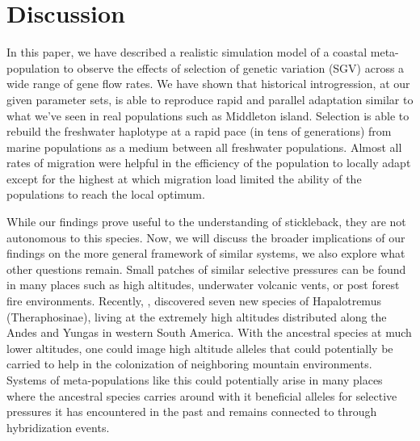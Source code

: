 \documentclass{article}
\begin{document}

\section*{Discussion}
 
In this paper, we have described a realistic simulation model of a coastal meta-population to observe the effects of selection of genetic variation (SGV) across a wide range of gene flow rates.
We have shown that historical introgression, at our given parameter sets, is able to reproduce rapid and parallel adaptation similar to what we've seen in real populations such as Middleton island. 
Selection is able to rebuild the freshwater haplotype at a rapid pace (in tens of generations) from marine populations as a medium between all freshwater populations. 
Almost all rates of migration were helpful in the efficiency of the population to locally adapt except for the highest at which migration load limited the ability of the populations to reach the local optimum. 

While our findings prove useful to the understanding of stickleback, they are not autonomous to this species. 
Now, we will discuss the broader implications of our findings on the more general framework of similar systems, we also explore what other questions remain. 
Small patches of similar selective pressures can be found in many places such as high altitudes, underwater volcanic vents, or post forest fire environments. 
Recently,  \citep{Ferretti2018}, discovered seven new species of Hapalotremus (Theraphosinae), living at the extremely high altitudes distributed along the Andes and Yungas in western South America.
With the ancestral species at much lower altitudes, one could image high altitude alleles that could potentially be carried to help in the colonization of neighboring mountain environments. 
Systems of meta-populations like this could potentially arise in many places
where the ancestral species carries around with it beneficial alleles for selective pressures it has encountered in the past and remains connected to through hybridization events.
\end{document}

